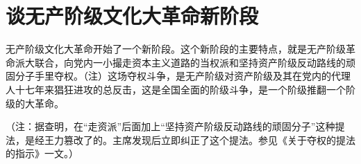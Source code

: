 \section[谈无产阶级文化大革命新阶段（一九六七年一月二十三日）]{谈无产阶级文化大革命新阶段}


无产阶级文化大革命开始了一个新阶段。这个新阶段的主要特点，就是无产阶级革命派大联合，向党内一小撮走资本主义道路的当权派和坚持资产阶级反动路线的顽固分子手里夺权。（注）这场夺权斗争，是无产阶级对资产阶级及其在党内的代理人十七年来猖狂进攻的总反击，这是全国全面的阶级斗争，是一个阶级推翻一个阶级的大革命。


（注：据查明，在“走资派”后面加上“坚持资产阶级反动路线的顽固分子”这种提法，是经王力篡改了的。主席发现后立即纠正了这个提法。参见《关于夺权的提法的指示》一文。）

